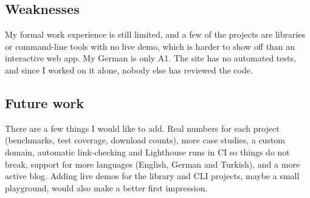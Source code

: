 \documentclass[11pt,a4paper]{article}
\begin{document}
\subsection{Weaknesses}
My formal work experience is still limited, and a few of the projects are libraries or command-line tools with no live demo, which is harder to show off than an interactive web app. My German is only A1. The site has no automated tests, and since I worked on it alone, nobody else has reviewed the code.

\subsection{Future work}
There are a few things I would like to add. Real numbers for each project (benchmarks, test coverage, download counts), more case studies, a custom domain, automatic link-checking and Lighthouse runs in CI so things do not break, support for more languages (English, German and Turkish), and a more active blog. Adding live demos for the library and CLI projects, maybe a small playground, would also make a better first impression.
\end{document}
